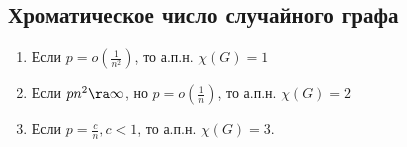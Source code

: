 \subsection{Хроматическое число случайного графа}
\begin{theorem}
    \begin{enumerate}
        \item Если \(p = o\left( \frac{1}{n^2} \right)\), то а.п.н. \(\chi(G) = 1\)
        \item Если \(pn^2 \ra \infty\), но \(p = o\left( \frac{1}{n} \right)\), то а.п.н. \(\chi(G) = 2\)
        \item Если \(p = \frac{c}{n}, c < 1\), то а.п.н. \(\chi(G) = 3\).
    \end{enumerate}
\end{theorem}